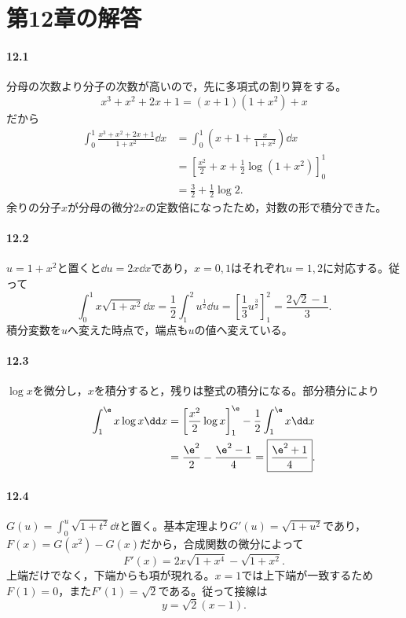 \section{第12章の解答}\label{解答:第12章}

\paragraph{12.1}
分母の次数より分子の次数が高いので，先に多項式の割り算をする。
\[
 x^3+x^2+2x+1=(x+1)(1+x^2)+x
\]
だから
\[
 \begin{aligned}
 \int_0^1\frac{x^3+x^2+2x+1}{1+x^2}\dd x
 &=\int_0^1\left(x+1+\frac{x}{1+x^2}\right)\dd x\\
 &=\left[\frac{x^2}{2}+x+\frac12\log(1+x^2)\right]_0^1\\
 &=\boxed{\frac32+\frac12\log2}.
 \end{aligned}
\]
余りの分子$x$が分母の微分$2x$の定数倍になったため，対数の形で積分できた。

\paragraph{12.2}
$u=1+x^2$と置くと$\dd u=2x\dd x$であり，$x=0,1$はそれぞれ$u=1,2$に対応する。従って
\[
 \int_0^1x\sqrt{1+x^2}\dd x
 =\frac12\int_1^2u^{\frac12}\dd u
 =\left[\frac13u^{\frac32}\right]_1^2
 =\boxed{\frac{2\sqrt2-1}{3}}.
\]
積分変数を$u$へ変えた時点で，端点も$u$の値へ変えている。

\paragraph{12.3}
$\log x$を微分し，$x$を積分すると，残りは整式の積分になる。部分積分により
\[
 \begin{aligned}
 \int_1^{\e}x\log x\dd x
 &=\left[\frac{x^2}{2}\log x\right]_1^{\e}
   -\frac12\int_1^{\e}x\dd x\\
 &=\frac{\e^2}{2}-\frac{\e^2-1}{4}
 =\boxed{\frac{\e^2+1}{4}}.
 \end{aligned}
\]

\paragraph{12.4}
$G(u)=\int_0^u\sqrt{1+t^2}\dd t$と置く。基本定理より$G'(u)=\sqrt{1+u^2}$であり，$F(x)=G(x^2)-G(x)$だから，合成関数の微分によって
\[
 F'(x)=2x\sqrt{1+x^4}-\sqrt{1+x^2}.
\]
上端だけでなく，下端からも項が現れる。$x=1$では上下端が一致するため$F(1)=0$，また$F'(1)=\sqrt2$である。従って接線は
\[
 \boxed{y=\sqrt2(x-1)}.
\]

